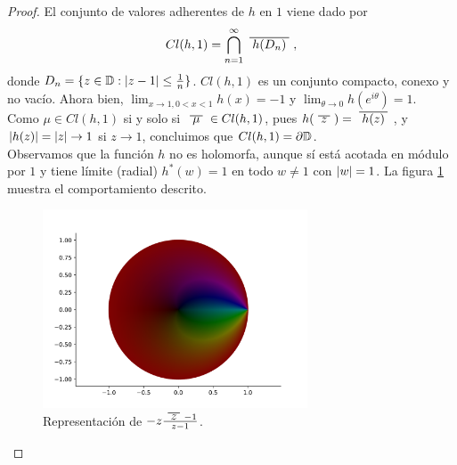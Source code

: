 \begin{proof}
    El conjunto de valores adherentes de $h$ en $1$ viene dado por
    \begin{equation*}
        Cl(h,1) = \bigcap_{n=1}^{\infty} \xbar{h(D_n)},
    \end{equation*}
    donde $D_n = \{z \in \mathbb{D} : \left\lvert z-1\right\rvert \leq \frac{1}{n}\}$. $Cl(h,1)$ es un conjunto compacto, conexo y no vacío. Ahora bien, $\lim_{x \to 1, 0 < x < 1} h(x) = -1$ y $\lim_{\theta \to 0} h(e^{i \theta}) = 1$. \\

    Como $\mu \in Cl(h,1)$ si y solo si $\xbar{\mu} \in Cl(h,1)$, pues $h(\xbar{z}) = \xbar{h(z)}$, y $\left\lvert h(z)\right\rvert = \left\lvert z\right\rvert \to 1$ si $z \to 1$, concluimos que $Cl(h,1) = \partial \mathbb{D}$. \\

    Observamos que la función $h$ no es holomorfa, aunque sí está acotada en módulo por $1$ y tiene límite (radial) $h^*(w) = 1$ en todo $w\neq 1$ con $\left\lvert w\right\rvert = 1$. La figura \ref{fig:h(z)} muestra el comportamiento descrito. \\

    \begin{figure}[!htbp]
        \centering
        \includegraphics[width=0.7\textwidth]{../Aplicacion/h(z).png}
        \caption{Representación de $-z \frac{\xbar{z} -1}{z - 1}$.}
        \label{fig:h(z)}
    \end{figure}
\end{proof}
